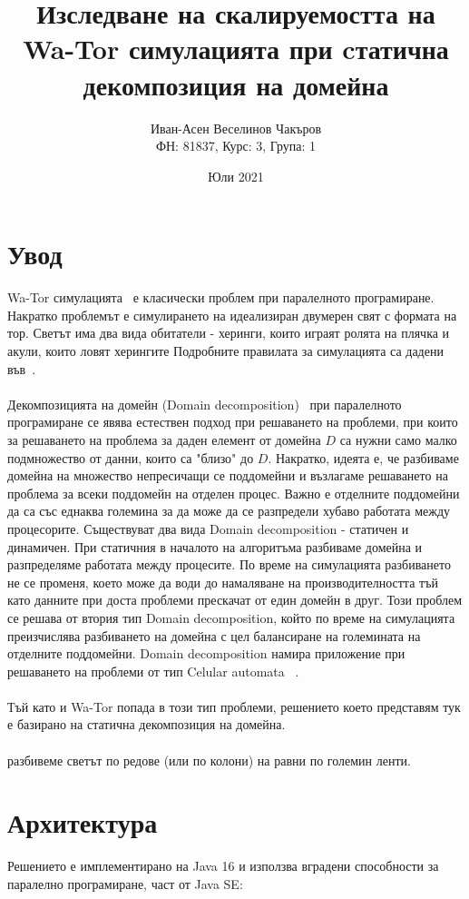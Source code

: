 \documentclass{article}
\title{Изследване на скалируемостта на Wa-Tor симулацията при cтатична декомпозиция на домейна}
\author{Иван-Асен Веселинов Чакъров \\
	ФН: 81837, Курс: 3, Група: 1}
\date{Юли 2021}
\begin{document}
\maketitle

\section{Увод}
Wa-Tor симулацията~\cite{wator} е класически проблем при паралелното програмиране.
Накратко проблемът е симулирането на идеализиран двумерен свят с формата на тор.
Светът има два вида обитатели - херинги, които играят ролята на плячка и акули, които ловят херингите
Подробните правилата за симулацията са дадени във~\cite{wator}.
\\
\\
Декомпозицията на домейн (Domain decomposition)~\cite{domain_decomposition}
при паралелното програмиране се явява естествен подход при решаването на проблеми,
при които за решаването на проблема за даден елемент от домейна $D$ са нужни само малко подмножество от данни,
които са "близо" до $D$. Накратко, идеята е, че разбиваме домейна на множество
непресичащи се поддомейни и възлагаме решаването на проблема за всеки поддомейн на
отделен процес. Важно е отделните поддомейни да са със еднаква големина за да може да се разпредели
хубаво работата между процесорите. Съществуват два вида Domain decomposition - статичен и динамичен.
При статичния в началото на алгоритъма разбиваме домейна и разпределяме работата между процесите.
По време на симулацията разбиването не се променя, което може да води до намаляване на производителността
тъй като данните при доста проблеми прескачат от един домейн в друг.
Този проблем се решава от втория тип Domain decomposition, който по време на симулацията
преизчислява разбиването на домейна с цел балансиране на големината на отделните поддомейни.
Domain decomposition намира приложение при решаването на проблеми от тип
Celular automata ~\cite{celular_automata}.
\\
\\
Тъй като и Wa-Tor попада в този тип проблеми, решението което представям тук е базирано
на статична декомпозиция на домейна.
\\
\\
разбивеме светът по редове (или по колони) на равни по големин ленти.

\section{Архитектура}
Решението е имплементирано на Java 16 и използва вградени способности за паралелно програмиране,
част от Java SE:
\end{document}
